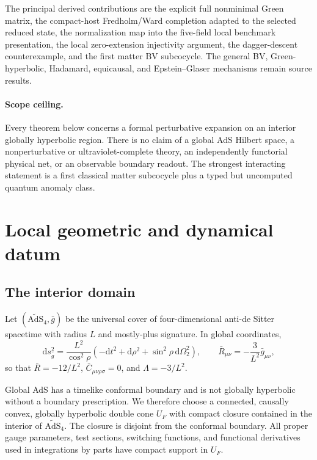 \documentclass[11pt]{article}
\theoremstyle{definition}
\theoremstyle{remark}
\newcommand{\U}{U_{F}}
\newcommand{\gbar}{\bar g}
\newcommand{\dd}{\mathrm d}
\begin{document}
The principal derived contributions are the explicit full nonminimal Green matrix,
the compact-host Fredholm/Ward completion adapted to the selected reduced state, the
normalization map into the five-field local benchmark presentation, the local zero-extension
injectivity argument, the dagger-descent counterexample, and the first matter BV
subcocycle.  The general BV, Green-hyperbolic, Hadamard, equicausal, and
Epstein--Glaser mechanisms remain source results.

\paragraph{Scope ceiling.}
Every theorem below concerns a formal perturbative expansion on an interior globally
hyperbolic region.  There is no claim of a global AdS Hilbert space, a nonperturbative
or ultraviolet-complete theory, an independently functorial physical net, or an
observable boundary readout.  The strongest interacting statement is a first classical
matter subcocycle plus a typed but uncomputed quantum anomaly class.

\section{Local geometric and dynamical datum}

\subsection{The interior domain}

Let $(\widetilde{\mathrm{AdS}}_4,\gbar)$ be the universal cover of four-dimensional
anti-de Sitter spacetime with radius $L$ and mostly-plus signature.  In global
coordinates,
\begin{equation}
 \dd s^2_{\gbar}=\frac{L^2}{\cos^2\rho}
 \left(-\dd t^2+\dd\rho^2+\sin^2\rho\,\dd\Omega_2^2\right),
 \qquad
 \bar R_{\mu\nu}=-\frac{3}{L^2}\gbar_{\mu\nu},
 \label{eq:adsmetric}
\end{equation}
so that $\bar R=-12/L^2$, $\bar C_{\mu\nu\rho\sigma}=0$, and
$\Lambda=-3/L^2$.

Global AdS has a timelike conformal boundary and is not globally hyperbolic without a
boundary prescription.  We therefore choose a connected, causally convex, globally
hyperbolic double cone $\U$ with compact closure contained in the interior of
$\widetilde{\mathrm{AdS}}_4$.  The closure is disjoint from the conformal boundary.
All proper gauge parameters, test sections, switching functions, and functional
derivatives used in integrations by parts have compact support in $\U$.
\end{document}
